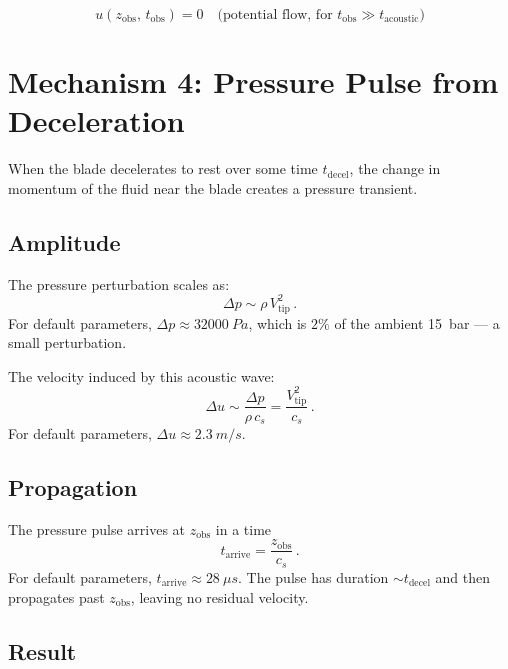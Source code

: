 \documentclass[11pt,a4paper]{article}
\begin{document}
\begin{equation}
  \boxed{u(z_\mathrm{obs},\, t_\mathrm{obs})
    = 0 \quad \text{(potential flow, for } t_\mathrm{obs}
    \gg t_\mathrm{acoustic}\text{)}}
\end{equation}


\section{Mechanism 4: Pressure Pulse from Deceleration}
\label{sec:pressure}

When the blade decelerates to rest over some time $t_\mathrm{decel}$,
the change in momentum of the fluid near the blade creates a pressure
transient.

\subsection{Amplitude}

The pressure perturbation scales as:
\begin{equation}
  \Delta p \sim \rho\, V_\mathrm{tip}^2\,.
  \label{eq:dp}
\end{equation}
For default parameters, $\Delta p \approx \SI{32000}{Pa}$, which is
$2\%$ of the ambient \SI{15}{bar} --- a small perturbation.

The velocity induced by this acoustic wave:
\begin{equation}
  \Delta u \sim \frac{\Delta p}{\rho\, c_s}
            = \frac{V_\mathrm{tip}^2}{c_s}\,.
  \label{eq:du_acoustic}
\end{equation}
For default parameters, $\Delta u \approx \SI{2.3}{m/s}$.

\subsection{Propagation}

The pressure pulse arrives at $z_\mathrm{obs}$ in a time
\begin{equation}
  t_\mathrm{arrive} = \frac{z_\mathrm{obs}}{c_s}\,.
\end{equation}
For default parameters, $t_\mathrm{arrive} \approx \SI{28}{\mu s}$.
The pulse has duration $\sim t_\mathrm{decel}$ and then propagates past
$z_\mathrm{obs}$, leaving no residual velocity.

\subsection{Result}
\end{document}
